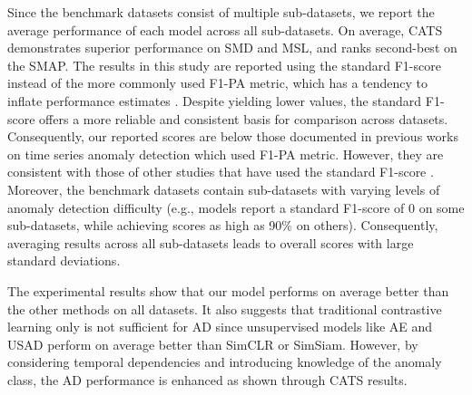 Since the benchmark datasets consist of multiple sub-datasets, we report the average performance of each model across all sub-datasets. On average, CATS demonstrates superior performance on SMD and MSL, and ranks second-best on the SMAP. The results in this study are reported using the standard F1-score instead of the more commonly used F1-PA metric, which has a tendency to inflate performance estimates \cite{DARBAN2025110874, kim2023contrastive, Ky2023MLMF}. Despite yielding lower values, the standard F1-score offers a more reliable and consistent basis for comparison across datasets. Consequently, our reported scores are below those documented in previous works on time series anomaly detection which used F1-PA metric. However, they are consistent with those of other studies that have used the standard F1-score \cite{DARBAN2025110874}. Moreover, the benchmark datasets contain sub-datasets with varying levels of anomaly detection difficulty (e.g., models report a standard F1-score of 0 on some sub-datasets, while achieving scores as high as 90\% on others). Consequently, averaging results across all sub-datasets leads to overall scores with large standard deviations.





The experimental results show that our model performs on average better than the other methods on all datasets. It also suggests that traditional contrastive learning only is not sufficient for AD since unsupervised models like AE and USAD perform on average better than SimCLR or SimSiam. However, by considering temporal dependencies and introducing knowledge of the anomaly class, the AD performance is enhanced as shown through CATS results.

